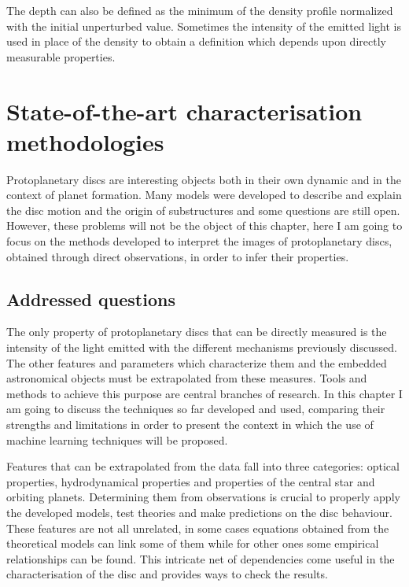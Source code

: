 \documentclass[a4paper,10pt]{report}
\begin{document}
The depth can also be defined as the minimum of the density profile normalized with the initial unperturbed value. Sometimes the intensity of the emitted light is used in place of the
density to obtain a definition which depends upon directly measurable properties.

\chapter{State-of-the-art characterisation methodologies}

Protoplanetary discs are interesting objects both in their own dynamic and
in the context of planet formation.
Many models were developed to describe and explain the disc motion and the origin of substructures and
some questions are still open. However, these problems will not be the object of this chapter, 
here I am going to focus on the methods developed to interpret the
images of protoplanetary discs, obtained through direct observations, in order to infer their properties.

\section{Addressed questions}


The only property of protoplanetary discs that can be directly measured
is the intensity of the light emitted with the different mechanisms previously discussed.
The other features and parameters which characterize them and the embedded astronomical objects
must be extrapolated from these measures. 
Tools and methods to achieve this purpose are central branches of research. In this chapter I am going to discuss
the techniques so far developed and used, comparing their strengths and limitations in order to present the context
in which the use of machine learning techniques will be proposed.


Features that can be extrapolated from the data fall into three categories: optical properties, hydrodynamical properties
and properties of the central star and orbiting planets.
Determining them from observations is crucial
to properly apply the developed models, test theories and make predictions on the disc behaviour.
These features are not all unrelated, in some cases equations obtained from the theoretical
models can link some of them while for other ones some empirical relationships can be found.
This intricate net of dependencies come useful in the characterisation of the disc and provides 
ways to check the results.
\end{document}
